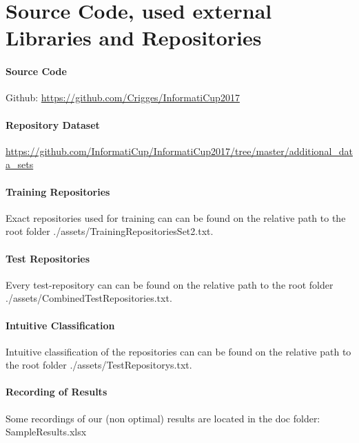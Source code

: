 \documentclass[paper=A4,pagesize=auto,12pt,headinclude=true,footinclude=true,BCOR=0mm,DIV=calc]{scrartcl}
\begin{document}
	
	\section{Source Code, used external Libraries and Repositories}
	\paragraph{Source Code}
	Github: \url{https://github.com/Crigges/InformatiCup2017}\\
	\paragraph{Repository Dataset}
	\label{src:Repositories}
	\url{https://github.com/InformatiCup/InformatiCup2017/tree/master/additional_data_sets}	\\
	
	\label{src:TrainingRepositories}
	\paragraph{Training Repositories}
	Exact repositories used for training can can be found on the relative path to the root folder ./assets/TrainingRepositoriesSet2.txt.
	
	\label{src:TestRepositories}
	\paragraph{Test Repositories}
	Every test-repository can can be found on the relative path to the root folder ./assets/CombinedTestRepositories.txt.
	
	\paragraph{Intuitive Classification}
	\label{src:ClassifyTestRepositories}
	Intuitive classification of the repositories can can be found on the relative path to the root folder ./assets/TestRepositorys.txt.
	
	\label{src:recordingsOfResults}
	\paragraph{Recording of Results}
	Some recordings of our (non optimal) results are located in the doc folder: SampleResults.xlsx
	
	
\end{document}
